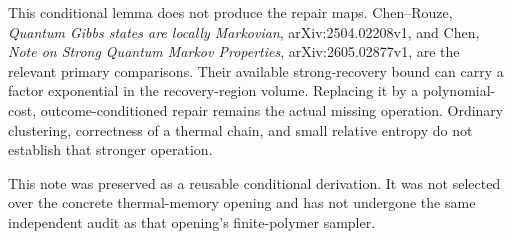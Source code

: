 This conditional lemma does not produce the repair maps. Chen--Rouze,
\emph{Quantum Gibbs states are locally Markovian}, arXiv:2504.02208v1, and
Chen, \emph{Note on Strong Quantum Markov Properties}, arXiv:2605.02877v1,
are the relevant primary comparisons. Their available strong-recovery bound
can carry a factor exponential in the recovery-region volume. Replacing it
by a polynomial-cost, outcome-conditioned repair remains the actual missing
operation. Ordinary clustering, correctness of a thermal chain, and small
relative entropy do not establish that stronger operation.

This note was preserved as a reusable conditional derivation. It was not
selected over the concrete thermal-memory opening and has not undergone
the same independent audit as that opening's finite-polymer sampler.

